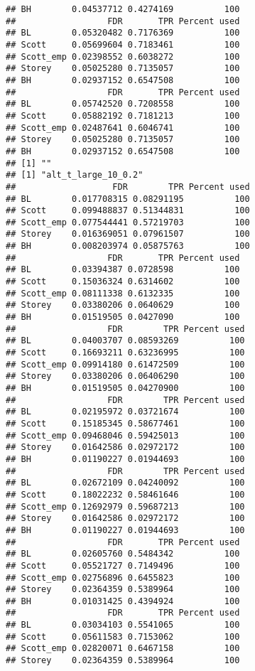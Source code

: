 \documentclass{article}\usepackage[]{graphicx}\usepackage[]{color}
\makeatletter
\newenvironment{kframe}{%
 \def\at@end@of@kframe{}%
 \ifinner\ifhmode%
  \def\at@end@of@kframe{\end{minipage}}%
  \begin{minipage}{\columnwidth}%
 \fi\fi%
 \def\FrameCommand##1{\hskip\@totalleftmargin \hskip-\fboxsep
 \colorbox{shadecolor}{##1}\hskip-\fboxsep
     \hskip-\linewidth \hskip-\@totalleftmargin \hskip\columnwidth}%
 \MakeFramed {\advance\hsize-\width
   \@totalleftmargin\z@ \linewidth\hsize
   \@setminipage}}%
 {\par\unskip\endMakeFramed%
 \at@end@of@kframe}
\newenvironment{knitrout}{}{} %
\makeatother
\begin{document}
\begin{knitrout}
\begin{kframe}
\begin{verbatim}
## BH        0.04537712 0.4274169          100
##                  FDR       TPR Percent used
## BL        0.05320482 0.7176369          100
## Scott     0.05699604 0.7183461          100
## Scott_emp 0.02398552 0.6038272          100
## Storey    0.05025280 0.7135057          100
## BH        0.02937152 0.6547508          100
##                  FDR       TPR Percent used
## BL        0.05742520 0.7208558          100
## Scott     0.05882192 0.7181213          100
## Scott_emp 0.02487641 0.6046741          100
## Storey    0.05025280 0.7135057          100
## BH        0.02937152 0.6547508          100
## [1] ""
## [1] "alt_t_large_10_0.2"
##                   FDR        TPR Percent used
## BL        0.017708315 0.08291195          100
## Scott     0.099488837 0.51344831          100
## Scott_emp 0.077544441 0.57219703          100
## Storey    0.016369051 0.07961507          100
## BH        0.008203974 0.05875763          100
##                  FDR       TPR Percent used
## BL        0.03394387 0.0728598          100
## Scott     0.15036324 0.6314602          100
## Scott_emp 0.08111338 0.6132335          100
## Storey    0.03380206 0.0640629          100
## BH        0.01519505 0.0427090          100
##                  FDR        TPR Percent used
## BL        0.04003707 0.08593269          100
## Scott     0.16693211 0.63236995          100
## Scott_emp 0.09914180 0.61472509          100
## Storey    0.03380206 0.06406290          100
## BH        0.01519505 0.04270900          100
##                  FDR        TPR Percent used
## BL        0.02195972 0.03721674          100
## Scott     0.15185345 0.58677461          100
## Scott_emp 0.09468046 0.59425013          100
## Storey    0.01642586 0.02972172          100
## BH        0.01190227 0.01944693          100
##                  FDR        TPR Percent used
## BL        0.02672109 0.04240092          100
## Scott     0.18022232 0.58461646          100
## Scott_emp 0.12692979 0.59687213          100
## Storey    0.01642586 0.02972172          100
## BH        0.01190227 0.01944693          100
##                  FDR       TPR Percent used
## BL        0.02605760 0.5484342          100
## Scott     0.05521727 0.7149496          100
## Scott_emp 0.02756896 0.6455823          100
## Storey    0.02364359 0.5389964          100
## BH        0.01031425 0.4394924          100
##                  FDR       TPR Percent used
## BL        0.03034103 0.5541065          100
## Scott     0.05611583 0.7153062          100
## Scott_emp 0.02820071 0.6467158          100
## Storey    0.02364359 0.5389964          100

\end{verbatim}
\end{kframe}
\end{knitrout}
\end{document}
